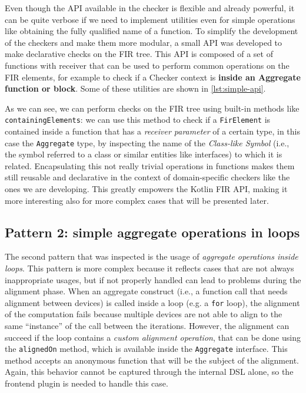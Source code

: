 \documentclass[12pt,a4paper,openright,twoside]{book}
\begin{document}
Even though the API available in the checker is flexible and already powerful,
it can be quite verbose if we need to implement utilities even for simple
operations like obtaining the fully qualified name of a function. To simplify
the development of the checkers and make them more modular, a small API was
developed to make declarative checks on the \ac{FIR} tree. This API is composed
of a set of functions with receiver that can be used to perform common
operations on the \ac{FIR} elements, for example to check if a Checker context
is \textbf{inside an Aggregate function or block}. Some of these utilities are
shown in \cref{lst:simple-api}.



As we can see, we can perform checks on the \ac{FIR} tree using built-in methods
like \lstinline{containingElements}: we can use this method to check if a
\lstinline{FirElement} is contained inside a function that has a \emph{receiver
parameter} of a certain type, in this case the \lstinline{Aggregate} type, by
inspecting the name of the \emph{Class-like Symbol} (i.e., the symbol referred
to a class or similar entities like interfaces) to which it is related. 
%
Encapsulating this not really trivial operations in functions makes them still
reusable and declarative in the context of domain-specific checkers like the
ones we are developing. This greatly empowers the Kotlin \ac{FIR} API, making it
more interesting also for more complex cases that will be presented later.

\subsection{Pattern 2: simple aggregate operations in loops} \label{sec:p2}

The second pattern that was inspected is the usage of \emph{aggregate operations
inside loops}. This pattern is more complex because it reflects cases that are
not always inappropriate usages, but if not properly handled can lead to
problems during the alignment phase. 
%
When an aggregate construct (i.e., a function call that needs alignment between
devices) is called inside a loop (e.g. a \lstinline{for} loop), the alignment of
the computation fails because multiple devices are not able to align to the same
``instance'' of the call between the iterations. 
%
However, the alignment can succeed if the loop contains a \emph{custom alignment
operation}, that can be done using the \lstinline{alignedOn} method, which is
available inside the \lstinline{Aggregate} interface. This method accepts an
anonymous function that will be the subject of the alignment. 
%
Again, this behavior cannot be captured through the internal DSL alone, so the
frontend plugin is needed to handle this case. 
\end{document}
